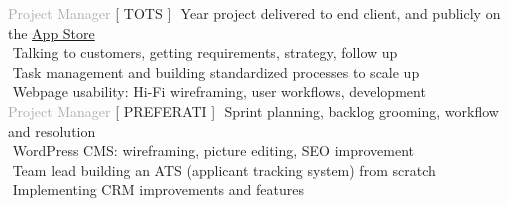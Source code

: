 \begin{cvtable}
{\textcolor{darkgray}{Project Manager}}%
{[ {T\scriptsize OTS} ]}%
{%
\textperiodcentered $ $ Year project delivered to end client, and publicly on the \href{https://apps.apple.com/app/dorotea-subastas/id1608944514}{App Store} \\
    \textperiodcentered $ $ Talking to customers, getting requirements, strategy, follow up \\  %
     \textperiodcentered $ $ Task management and building standardized processes to scale up \\
    \textperiodcentered $ $ Webpage usability: Hi-Fi wireframing, user workflows, development \\
}
% 
% 
{\textcolor{darkgray}{%
Project Manager}}%
{[ {P\scriptsize REFERATI} ]}%
{%
     \textperiodcentered $ $ Sprint planning, backlog grooming, workflow and resolution \\
     \textperiodcentered $ $ WordPress CMS: wireframing, picture editing, SEO improvement \\
     \textperiodcentered $ $ Team lead building an ATS (applicant tracking system) from scratch\\
     \textperiodcentered $ $ Implementing CRM improvements and features  \\
} 


\end{cvtable}
